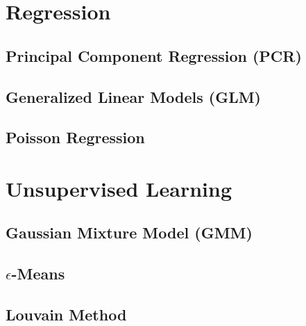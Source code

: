 \section{Regression}
\label{additional:Regression}

\subsection{Principal Component Regression (PCR)}
\label{additional:Regression:PCR}

\subsection{Generalized Linear Models (GLM)}
\label{additional:Regression:GLM}

\subsection{Poisson Regression}
\label{additional:Regression:poisson}

\section{Unsupervised Learning}
\label{additional:unsupervised}

\subsection{Gaussian Mixture Model (GMM)}
\label{additional:unsupervised:GMM}

\subsection{\texorpdfstring{$\epsilon$}{epsilon}-Means}
\label{additional:unsupervised:epsilonMean}

\subsection{Louvain Method}
\label{additional:unsupervised:louvain}

